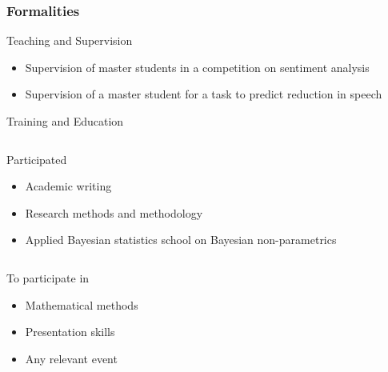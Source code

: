\documentclass[11pt,t]{beamer}
\newcounter{acolumn}%
\def\autoheight{\vspace*{0pt}}%
\begin{document}
\begin{frame}
    \frametitle{Formalities}

    \begin{block}{Teaching and Supervision}
        \begin{itemize}
            \item Supervision of master students in a competition on sentiment analysis
            \item Supervision of a master student for a task to predict reduction in speech
        \end{itemize}
    \end{block}

    \begin{block}{Training and Education}
        \begin{acolumns}[T,totalwidth=\textwidth]
            \begin{column}{0.5\textwidth}
                \begin{block}{Participated}
                    \begin{itemize}
                        \item Academic writing
                        \item Research methods and methodology
                        \item Applied Bayesian statistics school on Bayesian non-parametrics
                    \end{itemize}
                    \autoheight
                \end{block}
            \end{column}    
            \begin{column}{0.5\textwidth}
                \begin{block}{To participate in}
                    \begin{itemize}
                        \item Mathematical methods
                        \item Presentation skills
                        \item Any relevant event
                    \end{itemize}
                    \autoheight
                \end{block}
            \end{column}    
        \end{acolumns}
    \end{block}
\end{frame}
\end{document}
